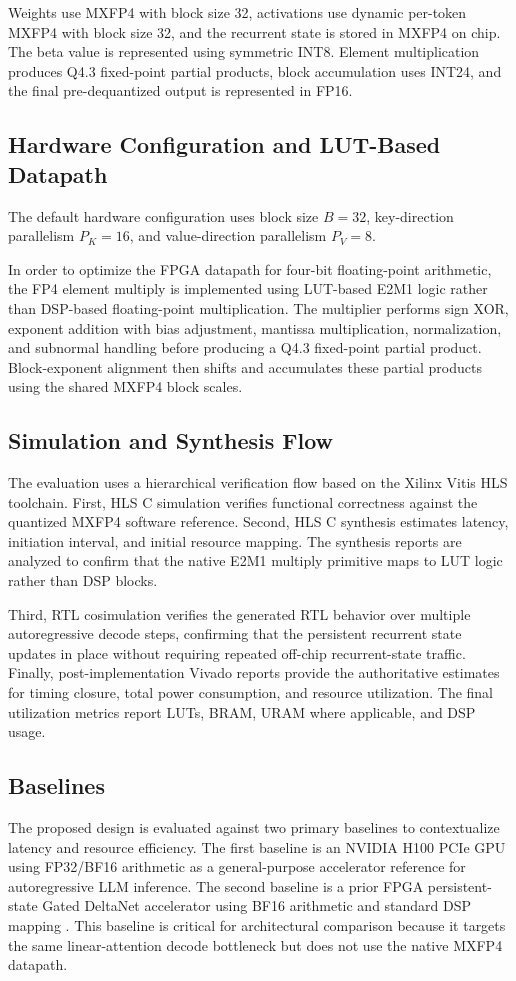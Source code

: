 ﻿\documentclass[conference]{IEEEtran}
\begin{document}
Weights use MXFP4 with block size 32, activations use dynamic per-token MXFP4 with block size 32, and the recurrent state is stored in MXFP4 on chip. The beta value is represented using symmetric INT8. Element multiplication produces Q4.3 fixed-point partial products, block accumulation uses INT24, and the final pre-dequantized output is represented in FP16.

\subsection{Hardware Configuration and LUT-Based Datapath}
The default hardware configuration uses block size $B=32$, key-direction parallelism $P_K=16$, and value-direction parallelism $P_V=8$.

In order to optimize the FPGA datapath for four-bit floating-point arithmetic, the FP4 element multiply is implemented using LUT-based E2M1 logic rather than DSP-based floating-point multiplication. The multiplier performs sign XOR, exponent addition with bias adjustment, mantissa multiplication, normalization, and subnormal handling before producing a Q4.3 fixed-point partial product. Block-exponent alignment then shifts and accumulates these partial products using the shared MXFP4 block scales.

\subsection{Simulation and Synthesis Flow}
The evaluation uses a hierarchical verification flow based on the Xilinx Vitis HLS toolchain. First, HLS C simulation verifies functional correctness against the quantized MXFP4 software reference. Second, HLS C synthesis estimates latency, initiation interval, and initial resource mapping. The synthesis reports are analyzed to confirm that the native E2M1 multiply primitive maps to LUT logic rather than DSP blocks.

Third, RTL cosimulation verifies the generated RTL behavior over multiple autoregressive decode steps, confirming that the persistent recurrent state updates in place without requiring repeated off-chip recurrent-state traffic. Finally, post-implementation Vivado reports provide the authoritative estimates for timing closure, total power consumption, and resource utilization. The final utilization metrics report LUTs, BRAM, URAM where applicable, and DSP usage.

\subsection{Baselines}
The proposed design is evaluated against two primary baselines to contextualize latency and resource efficiency. The first baseline is an NVIDIA H100 PCIe GPU using FP32/BF16 arithmetic as a general-purpose accelerator reference for autoregressive LLM inference. The second baseline is a prior FPGA persistent-state Gated DeltaNet accelerator using BF16 arithmetic and standard DSP mapping \cite{b10}. This baseline is critical for architectural comparison because it targets the same linear-attention decode bottleneck but does not use the native MXFP4 datapath.
\end{document}
